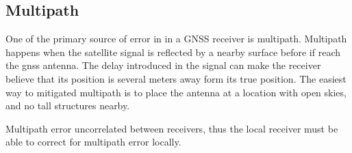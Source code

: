 \subsection{Multipath}
One of the primary source of error in in a GNSS receiver is multipath. Multipath happens when the satellite signal is reflected by a nearby surface before if reach the \gls{gnss} antenna. The delay introduced in the signal can make the receiver believe that its position is several meters away form its true position. The easiest way to mitigated multipath is to place the antenna at a location with open skies, and no tall structures nearby.

Multipath error uncorrelated between receivers, thus the local receiver must be able to correct for multipath error locally.
\cleardoublepage